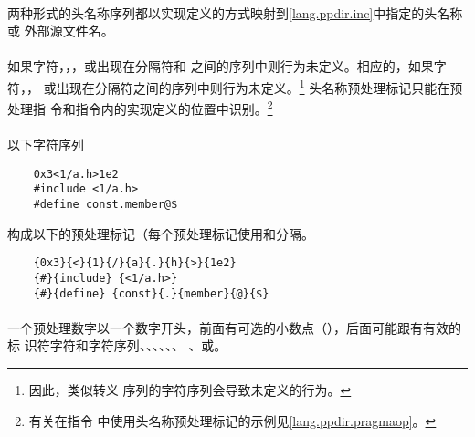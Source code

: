 {\semantic
\paragraph{}
两种形式的头名称序列都以实现定义的方式映射到\ref{lang.ppdir.inc}中指定的头名称或
外部源文件名。

\paragraph{}
如果字符\tm{\sq}，\tm{\bs}，\tm{\dq}，\tm{\bs\bs}或\tm{/*}出现在分隔符\tm{<}和
\tm{>}之间的序列中则行为未定义。相应的，如果字符\tm{\sq}，\tm{\bs}，\tm{\bs\bs}
或\tm{/*}出现在\tm{\dq}分隔符之间的序列中则行为未定义。\footnote{因此，类似转义
序列的字符序列会导致未定义的行为。} 头名称预处理标记只能在预处理指
令和指令内的实现定义的位置中识别。\footnote{有关在指令
中使用头名称预处理标记的示例见\ref{lang.ppdir.pragmaop}。}

\paragraph{}
\ex* 以下字符序列
\begin{lstlisting}
    0x3<1/a.h>1e2
    #include <1/a.h>
    #define const.member@$
\end{lstlisting}
构成以下的预处理标记（每个预处理标记使用\tm{\{}和\tm{\}}分隔。
\begin{lstlisting}
    {0x3}{<}{1}{/}{a}{.}{h}{>}{1e2}
    {#}{include} {<1/a.h>}
    {#}{define} {const}{.}{member}{@}{$}
\end{lstlisting}


\syntax
\paragraph{}

\desc
\paragraph{}
一个预处理数字以一个数字开头，前面有可选的小数点（），后面可能跟有有效的标
识符字符和字符序列、、、、、、
、或。

}
